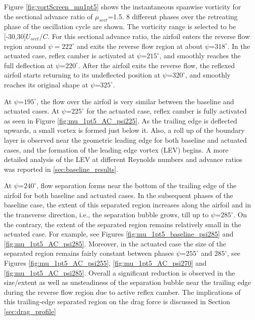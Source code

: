 Figure \ref{fig:vortScreen_mu1pt5} shows the instantaneous spanwise vorticity for the sectional advance ratio of $\mu_{sect}$=1.5.
8 different phases over the retreating phase of the oscillation cycle are shown. The vorticity range is selected to be [-30,30]$ U_{sect}/C$. For this sectional advance ratio, the airfoil enters the reverse flow region around $\psi=222^\circ$ and exits the reverse flow region at about $\psi$=$318^\circ$. In the actuated case, reflex camber is activated at $\psi$=$215^\circ$, and smoothly reaches the full deflection at $\psi$=$220^\circ$. After the airfoil exits the reverse flow, the reflexed airfoil starts returning to its undeflected position at $\psi$=$320^\circ$, and smoothly reaches its original shape at $\psi$=$325^\circ$.


At $\psi$=$195^\circ$, the flow over the airfoil is very similar between the baseline and actuated cases.
At $\psi$=$225^\circ$ for the actuated case, reflex camber is fully activated as seen in Figure \ref{fig:mu_1pt5_AC_psi225}. As the trailing edge is deflected upwards, a small vortex is formed just below it. Also, a roll up of the boundary layer is observed near the geometric leading edge for both baseline and actuated cases, and the formation of the leading edge vortex (LEV) begins. A more detailed analysis of the LEV at different Reynolds numbers and advance ratios was reported in \ref{sec:baseline_results}.

At $\psi$=$240^\circ$, flow separation forms near the bottom of the trailing edge of the airfoil for both baseline and actuated cases.
In the subsequent phases of the baseline case, the extent of this separated region increases along the airfoil and in the transverse direction, i.e., the separation bubble grows, till up to $\psi$=$285^\circ$. 
On the contrary, the extent of the separated region remains relatively small in the actuated case. For example, see Figures \ref{fig:mu_1pt5_baseline_psi285} and \ref{fig:mu_1pt5_AC_psi285}.
Moreover, in the actuated case the size of the separated region remains fairly constant between phases $\psi$=$255^\circ$ and $285^\circ$, see Figures \ref{fig:mu_1pt5_AC_psi255}, \ref{fig:mu_1pt5_AC_psi270} and \ref{fig:mu_1pt5_AC_psi285}.
Overall a significant reduction is observed in the size/extent as well as unsteadiness of the separation bubble near the trailing edge during the reverse flow region due to active reflex camber.
The implications of this trailing-edge separated region on the drag force is discussed in Section \ref{sec:drag_profile}

